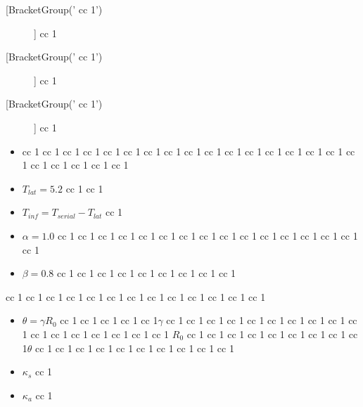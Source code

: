 \documentclass[11pt]{article}
\begin{document}
    \begin{description}
        \item[[BracketGroup(' cc 1')]]  cc 1
\item[[BracketGroup(' cc 1')]]  cc 1
\item[[BracketGroup(' cc 1')]]  cc 1
\end{description}

    \begin{itemize}
	\item  cc 1  cc 1  cc 1  cc 1  cc 1  cc 1
 cc 1  cc 1  cc 1  cc 1  cc 1  cc 1  cc 1  cc 1  cc 1  cc 1  cc 1  cc 1  cc 1  cc 1  cc 1  cc 1
\item $T_{lat}=5.2$ cc 1  cc 1

	\item $T_{inf}=T_{serial}-T_{lat}$ cc 1
\item $\alpha=1.0$ cc 1  cc 1  cc 1  cc 1  cc 1  cc 1  cc 1  cc 1  cc 1  cc 1  cc 1  cc 1
 cc 1  cc 1  cc 1  cc 1
\item $\beta=0.8$ cc 1  cc 1  cc 1  cc 1  cc 1  cc 1  cc 1  cc 1  cc 1
\end{itemize}

 cc 1  cc 1  cc 1  cc 1  cc 1  cc 1  cc 1  cc 1  cc 1  cc 1  cc 1  cc 1  cc 1

\begin{itemize}
   \item $\theta=\gamma R_0$ cc 1  cc 1  cc 1  cc 1  cc 1$\gamma$ cc 1
 cc 1  cc 1  cc 1  cc 1  cc 1  cc 1  cc 1  cc 1  cc 1  cc 1  cc 1  cc 1  cc 1  cc 1  cc 1  cc 1
$R_0$ cc 1  cc 1  cc 1  cc 1  cc 1  cc 1  cc 1  cc 1  cc 1$\theta$ cc 1  cc 1  cc 1
 cc 1  cc 1  cc 1  cc 1  cc 1  cc 1  cc 1
\item $\kappa _s$ cc 1
\item $\kappa _a$ cc 1
\end{itemize}
\end{document}
